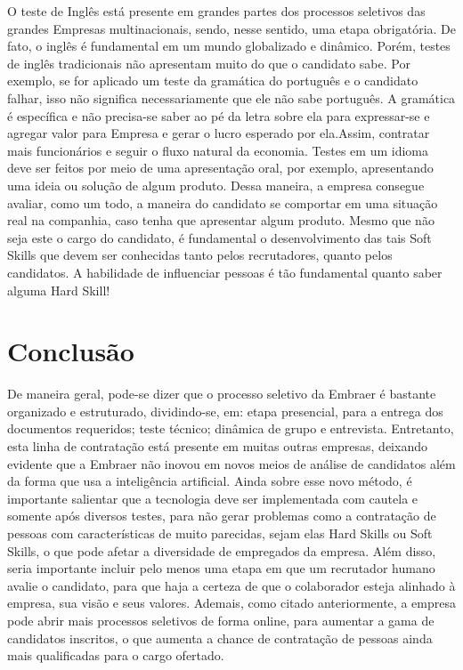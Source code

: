 O teste de Inglês está presente em grandes partes dos processos seletivos das grandes Empresas multinacionais, sendo, nesse sentido, uma etapa obrigatória. De fato, o inglês é fundamental em um mundo globalizado e dinâmico. Porém, testes de inglês tradicionais não apresentam muito do que o candidato sabe. Por exemplo, se for aplicado um teste da gramática do português e o candidato falhar, isso não significa necessariamente que ele não sabe português. A gramática é específica e não precisa-se saber ao pé da letra sobre ela para expressar-se e agregar valor para Empresa e gerar o lucro esperado por ela.Assim, contratar mais funcionários e seguir o fluxo natural da economia. Testes em um idioma deve ser feitos por meio de uma apresentação oral, por exemplo, apresentando uma ideia ou solução de algum produto. Dessa maneira, a empresa consegue avaliar, como um todo, a maneira  do candidato se comportar em uma situação real na companhia, caso tenha que apresentar algum produto. Mesmo que não seja este o cargo do candidato, é fundamental o desenvolvimento das tais Soft Skills que devem ser conhecidas tanto pelos recrutadores, quanto pelos candidatos. A habilidade de influenciar pessoas é tão fundamental quanto saber alguma Hard Skill!



\chapter{Conclusão}
De maneira geral, pode-se dizer que o processo seletivo da Embraer é bastante organizado e estruturado, dividindo-se, em: etapa presencial, para a entrega dos documentos requeridos; teste técnico; dinâmica de grupo e entrevista. Entretanto, esta linha de contratação está presente em muitas outras empresas, deixando evidente que a Embraer não inovou em novos meios de análise de candidatos além da forma que usa a inteligência artificial. Ainda sobre esse novo método, é importante salientar que a tecnologia deve ser implementada com cautela e somente após diversos testes, para não gerar problemas como a contratação de pessoas com características de muito parecidas, sejam elas Hard Skills ou Soft Skills, o que pode afetar a diversidade de empregados da empresa. Além disso, seria importante incluir pelo menos uma etapa em que um recrutador humano avalie o candidato, para que haja a certeza de que o colaborador esteja alinhado à empresa, sua visão e seus valores. Ademais, como citado anteriormente, a empresa pode abrir mais processos seletivos de forma online, para aumentar a gama de candidatos inscritos, o que aumenta a chance de contratação de pessoas ainda mais qualificadas para o cargo ofertado.
